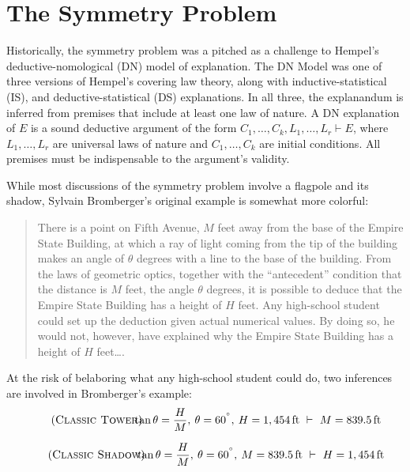 \documentclass[natbib]{svjour3}                     %
\begin{document}
\section{The Symmetry Problem}
\label{sec:symm_problem}
 
Historically, the symmetry problem was a pitched as a challenge to Hempel's deductive-nomological (DN) model of explanation. The DN Model was one of three versions of Hempel's covering law theory, along with inductive-statistical (IS), and deductive-statistical (DS) explanations. In all three, the explanandum is inferred from premises that include at least one law of nature. A DN explanation of $E$ is a sound deductive argument of the form $C_1, \dots, C_k, L_1, \dots, L_r  \vdash E$, where $L_1, \dots, L_r$ are universal laws of nature and $C_1, \dots, C_k$ are initial conditions. All premises must be indispensable to the argument's validity. 

While most discussions of the symmetry problem involve a flagpole and its shadow, Sylvain Bromberger's original example is somewhat more colorful:

\begin{quote}
	There is a point on Fifth Avenue, $M$ feet away from the base of the
	Empire State Building, at which a ray of light coming from the tip of the
	building makes an angle of $\theta$ degrees with a line to the base of the
	building. From the laws of geometric optics, together with the ``antecedent''
	condition that the distance is $M$ feet, the angle $\theta$ degrees, it is
	possible to deduce that the Empire State Building has a height of $H$ feet.
	Any high-school student could set up the deduction given actual
	numerical values. By doing so, he would not, however, have explained
	why the Empire State Building has a height of $H$ feet\ldots \citep[p.92]{Bromberger1966}.
\end{quote}

\noindent At the risk of belaboring what any high-school student could do, two inferences are involved in Bromberger's example:
\begin{equation}
\label{Classic_Tower}\tag{\textsc{Classic Tower}}
	\hspace{-.3cm}\tan \theta  = \frac{H}{M},\hspace{.5ex} \theta = 60^{^\circ},\hspace{.5ex} H = 1,454\,\text{ft} \,\,\vdash\,\, M = 839.5\,\text{ft}
\end{equation}

\begin{equation}
\label{Classic_Shadow}\tag{\textsc{Classic Shadow}}
	\hspace{-.3cm}\tan \theta  = \frac{H}{M},\hspace{.5ex} \theta = 60^{^\circ},\hspace{.5ex}  M = 839.5\,\text{ft} \,\,\vdash\,\,  H = 1,454\,\text{ft}
\end{equation}
\end{document}
